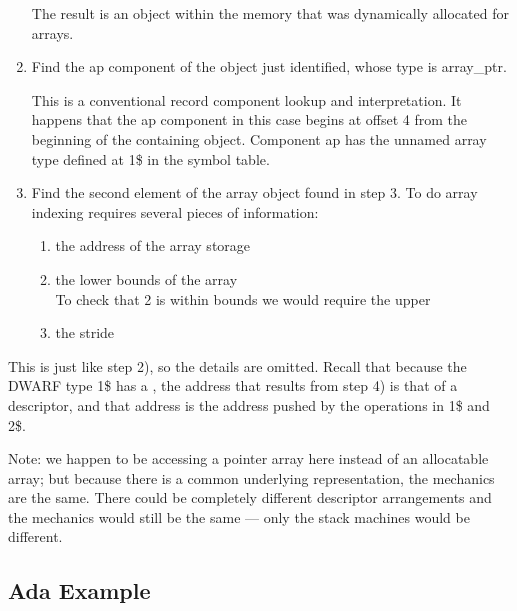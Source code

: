 \begin{enumerate}[1.]
The result is an object within the memory that was dynamically
allocated for arrays.

\item  Find the ap component of the object just identified,
whose type is array\_ptr.

This is a conventional record component lookup and
interpretation. It happens that the ap component in this case
begins at offset 4 from the beginning of the containing object.
Component ap has the unnamed array type defined at 1\$ in the
symbol table.

\item  Find the second element of the array object found in step 3. To do array indexing requires
several pieces of information:

\begin{enumerate}[a]
\item  the address of the array storage

\item  the lower bounds of the array \\
\lbrack To check that 2 is within bounds we would require the upper

\item  the stride

\end{enumerate}
\end{enumerate}

This is just like step 2), so the details are omitted. Recall
that because the DWARF type 1\$ has a ,
the address that results from step 4) is that of a
descriptor, and that address is the address pushed by the
 operations in 1\$ and 2\$.

Note: we happen to be accessing a pointer array here instead
of an allocatable array; but because there is a common
underlying representation, the mechanics are the same. There
could be completely different descriptor arrangements and the
mechanics would still be the same — only the stack machines
would be different.



\subsection{Ada Example}
\label{app:adaexample}

